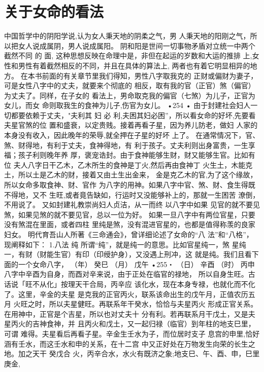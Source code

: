 \section{关于女命的看法}

中国哲学中的阴阳学说,认为女人秉天地的阴柔之气，男
人秉天地的阳刚之气，所以把女人说成属阴，男人说成属阳。
阴和阳是世间一切事物矛盾对立统一中两个截然不同 的 面,
这种思想反映在命理中是，非但在起运的岁数和大运的推排
上,女性和男性有着截然相反的不同，并且在具体的算法上,
两者也有着它明显相异的地方。
在本书前面的有关章节里我们得知，男性八字取我克的
正财或偏财为妻子，可是女性八字中的丈夫，就要来个彻底的
相反，取有我的官（正官）煞（偏官）为丈夫了。同样，在子女的
看法上，男命取克我的偏官（七煞）为儿子，正官为女儿，而女
命则取我生的食神为儿子,伤官为女儿。
•254 •
由于封建社会妇人一切都要依赖于丈夫，"夫利其 妇 必
利,夫困其妇必困”，所以看女命的好坏,先要看夫星官煞的位
置和盛衰，以定贵贱。接着再看子星，因为养儿防老，做妇
人家的本身没有收入，因此晚年的荣辱,就全押在子星的好坏
上了。
在通常情况下，官、煞、财得地，有利于丈夫，食神得地，有
利于孩子。丈夫利则出身富贵，一生享福；孩子利则晚年养
厚，褒宠诰封。由于食神能够生财，财又能够生官。比如有位
夫人八字日干乙木，乙木所生的食神是丁火,然后再由食神丁
火生土，木能克土，所以土是乙木的财，接着又由土生出金来，
金是克乙木的官,为了这个缘故，所以女命多取食神、财、官作
为八字的用神。如果八字中官、煞、财、食生得既不得地，又不
生旺,或者竟告缺如，行运时又没能够补上的，那就一生困苦
潦倒，不用说了。
又如封建礼教崇尚妇人贞洁，从一而终 以八字中如果
见官的就不要见煞，如果见煞的就不要见官，总以一位为好。
如果一旦八字中有两位官星，只要没有煞混在里面，或者四柱
里纯是煞，没有混进官星的，也都是值得称羡的良家妇女。
明代育吾山人所著《三命通会》，曾详细论述了女命的“八
法”和“八格”，现阐释如下：
1.八法
纯 所谓“纯”，就是纯一的意思。比如官星纯一，煞
星纯一，有财（财能生官）有印（印绶护身），又没遇上刑冲，这
就是纯。我们且看下面的一个女命八字，
（年） 癸巳
（月） 戊午
•255・
（日） 辛酉
（时） 丙申
八字中辛酉为自身，而酉对辛来说，由于正处在临官的禄地，
所以自身生旺。古话说「旺不从化」按理天干合局，丙辛应
该化水，现在本身专禄，也就化而不化了。这里，辛金的夫星
是克我的正官丙火，联系该命出生的戊午月，正值农历五月
火旺之时，所以夫星健旺。再联系年干癸水，恰恰与夫星丙火
形成正官关系。在用神中，正官是个吉星，所以也对丈夫十
分有利。若再联系月干戊土，又是夫星丙火的吉神食神，并
且丙火和戊土，又一起归禄（临官）到年柱的地支巳里，可谓
难得。夫星看后再看子星。辛金生壬水为子，而位居时支子
息宫的申里,恰好涵有壬水，而这壬水和申的关系，在十二宫
中又正好处在万物发生向荣的长生之地。加之天干 癸戊合
火，丙辛合水，水火有既济之象;地支巳、午、酉、申，巳里庚金,

